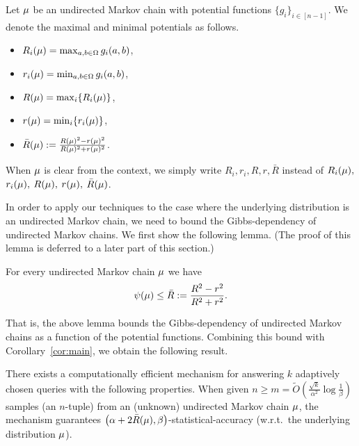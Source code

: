 \documentclass[12pt,a4paper,oneside,onecolumn]{book}
\begin{document}
\begin{definition}
Let $\mu$ be an undirected Markov chain with potential functions $\{g_i\}_{i\in[n-1]}$. We denote the maximal and minimal potentials as follows.
\begin{itemize}
    \item $R_i(\mu) = \max_{a,b\in \Omega}g_i(a,b)$,
    \item $r_i(\mu) = \min_{a,b\in \Omega}g_i(a,b)$,
    \item $R(\mu) = \max_i \{R_i(\mu)\}$,
    \item $r(\mu) = \min_i \{r_i(\mu)\}$,
    \item $\bar{R}(\mu) := \frac{R(\mu)^2-r(\mu)^2}{R(\mu)^2+r(\mu)^2}$.
\end{itemize}
When $\mu$ is clear from the context, we simply write $R_i,r_i,R,r,\bar{R}$ instead of $R_i(\mu),$ $r_i(\mu),$ $R(\mu),$ $r(\mu),$ $\bar{R}(\mu)$.
\end{definition}

In order to apply our techniques to the case where the underlying distribution is an undirected Markov chain, we need to bound the Gibbs-dependency of undirected Markov chains. We first show the following lemma. (The proof of this lemma is deferred to a later part of this section.)

\begin{lemma}\label{lem:markovbound}
For every undirected Markov chain $\mu$ we have
\[
\psi(\mu) \leq \bar{R}:=
\frac{R^2 - r^2}{R^2 + r^2}.
\]
\end{lemma}

That is, the above lemma bounds the Gibbs-dependency of undirected Markov chains as a function of the potential functions. Combining this bound with Corollary~\ref{cor:main}, we obtain the following result.


\begin{corollary}\label{cor:barR}
There exists a computationally efficient mechanism for answering $k$ adaptively chosen queries with the following properties. When given $n\geq 
m
=
\tilde{O}\left( \frac{\sqrt{k}}{\alpha^2}\log\frac{1}{\beta} \right)$ samples (an $n$-tuple) from an (unknown) undirected Markov chain $\mu$, the mechanism guarantees $\left(\alpha+2\bar{R}(\mu),\beta\right)$-statistical-accuracy (w.r.t.\ the underlying distribution $\mu$).
\end{corollary}
\end{document}
